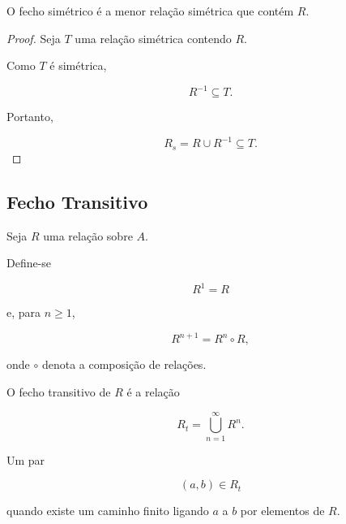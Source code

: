\documentclass[../../main]{subfiles}
\begin{document}
\begin{prop}
	\label{prop:matematica:relacoes:fechos:minimalidade-fecho-simetrico}

	O fecho simétrico é a menor relação simétrica que contém \(R\).

\end{prop}

\begin{proof}

	Seja \(T\) uma relação simétrica contendo \(R\).

	Como \(T\) é simétrica,

	\[
		R^{-1}\subseteq T.
	\]

	Portanto,

	\[
		R_s
		=
		R\cup R^{-1}
		\subseteq T.
	\]

\end{proof}

\subsection{Fecho Transitivo}

\begin{defn}
	\label{def:matematica:relacoes:fechos:potencia-relacao}

	Seja \(R\) uma relação sobre \(A\).

	Define-se

	\[
		R^1 = R
	\]

	e, para \(n\ge 1\),

	\[
		R^{n+1}
		=
		R^n \circ R,
	\]

	onde \(\circ\) denota a composição de relações.

\end{defn}

\begin{defn}
	\label{def:matematica:relacoes:fechos:fecho-transitivo}

	O fecho transitivo de \(R\) é a relação

	\[
		R_t
		=
		\bigcup_{n=1}^{\infty} R^n.
	\]

\end{defn}

\begin{obs}

	Um par

	\[
		(a,b)\in R_t
	\]

	quando existe um caminho finito ligando \(a\) a \(b\) por elementos de
	\(R\).

\end{obs}
\end{document}
